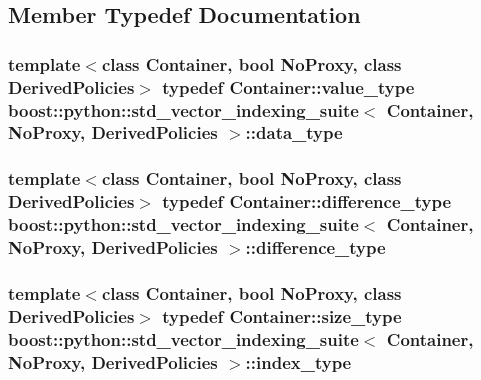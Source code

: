 \subsection{Member Typedef Documentation}
\hypertarget{classboost_1_1python_1_1std__vector__indexing__suite_a9c3db9df25d6966c54154275377c94ce}{
\subsubsection[{data\-\_\-type}]{\setlength{\rightskip}{0pt plus 5cm}template$<$class Container, bool No\-Proxy, class Derived\-Policies$>$ typedef Container\-::value\-\_\-type {\bf boost\-::python\-::std\-\_\-vector\-\_\-indexing\-\_\-suite}$<$ Container, No\-Proxy, Derived\-Policies $>$\-::{\bf data\-\_\-type}}}\label{classboost_1_1python_1_1std__vector__indexing__suite_a9c3db9df25d6966c54154275377c94ce}
\hypertarget{classboost_1_1python_1_1std__vector__indexing__suite_a546a5483c04385c153a5987f5ba16709}{
\subsubsection[{difference\-\_\-type}]{\setlength{\rightskip}{0pt plus 5cm}template$<$class Container, bool No\-Proxy, class Derived\-Policies$>$ typedef Container\-::difference\-\_\-type {\bf boost\-::python\-::std\-\_\-vector\-\_\-indexing\-\_\-suite}$<$ Container, No\-Proxy, Derived\-Policies $>$\-::{\bf difference\-\_\-type}}}\label{classboost_1_1python_1_1std__vector__indexing__suite_a546a5483c04385c153a5987f5ba16709}
\hypertarget{classboost_1_1python_1_1std__vector__indexing__suite_a3124827b535a08798fbd33b9fee7b668}{
\subsubsection[{index\-\_\-type}]{\setlength{\rightskip}{0pt plus 5cm}template$<$class Container, bool No\-Proxy, class Derived\-Policies$>$ typedef Container\-::size\-\_\-type {\bf boost\-::python\-::std\-\_\-vector\-\_\-indexing\-\_\-suite}$<$ Container, No\-Proxy, Derived\-Policies $>$\-::{\bf index\-\_\-type}}}\label{classboost_1_1python_1_1std__vector__indexing__suite_a3124827b535a08798fbd33b9fee7b668}
